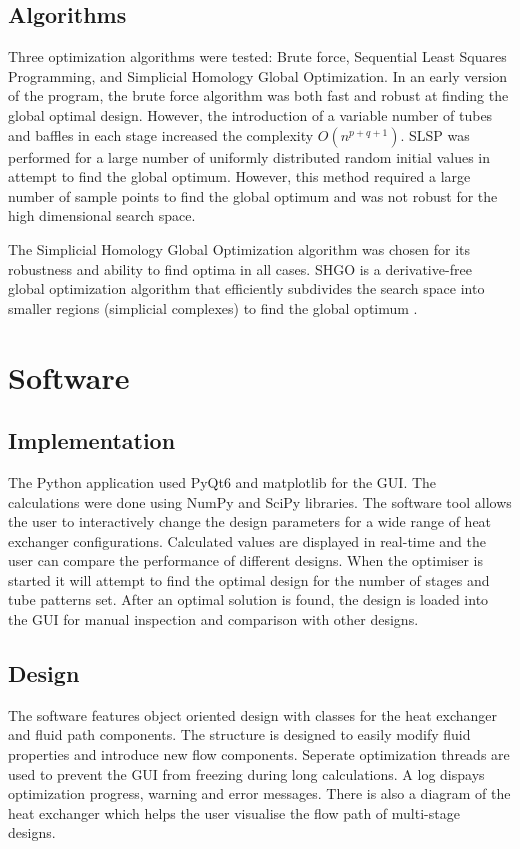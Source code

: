 \documentclass{article}
\begin{document}
\subsection{Algorithms}
Three optimization algorithms were tested: Brute force, Sequential Least Squares Programming, and Simplicial Homology Global Optimization.
In an early version of the program, the brute force algorithm was both fast and robust at finding the global optimal design.
However, the introduction of a variable number of tubes and baffles in each stage increased the complexity $O(n^{p+q+1})$.
SLSP was performed for a large number of uniformly distributed random initial values in attempt to find the global optimum.
However, this method required a large number of sample points to find the global optimum and was not robust for the high dimensional search space.

The Simplicial Homology Global Optimization algorithm was chosen for its robustness and ability to find optima in all cases.
SHGO is a derivative-free global optimization algorithm that efficiently subdivides the search space into smaller regions (simplicial complexes) to find the global optimum \cite{SHGO}.

\section{Software}

\subsection{Implementation}

The Python application used PyQt6 and matplotlib for the GUI. The calculations were done using NumPy and SciPy libraries.
The software tool allows the user to interactively change the design parameters for a wide range of heat exchanger configurations.
Calculated values are displayed in real-time and the user can compare the performance of different designs.
When the optimiser is started it will attempt to find the optimal design for the number of stages and tube patterns set.
After an optimal solution is found, the design is loaded into the GUI for manual inspection and comparison with other designs.

\subsection{Design}
The software features object oriented design with classes for the heat exchanger and fluid path components.
The structure is designed to easily modify fluid properties and introduce new flow components.
Seperate optimization threads are used to prevent the GUI from freezing during long calculations.
A log dispays optimization progress, warning and error messages. There is also a diagram of the heat exchanger which helps
the user visualise the flow path of multi-stage designs.
\end{document}
